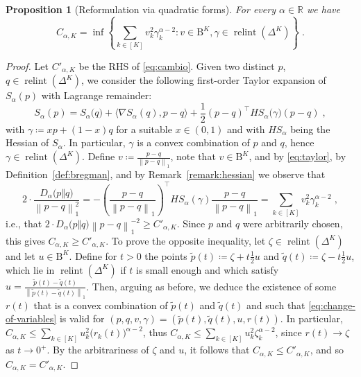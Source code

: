 \documentclass[11pt,oneside,a4paper]{article}
\newcommand{\R}{\mathbb{R}}
\newcommand{\lrb}[1]{\left(#1\right)}
\newcommand{\brb}[1]{\bigl(#1\bigr)}
\newcommand{\lcb}[1]{\left\{#1\right\}}
\newcommand{\lno}[1]{\left\lVert#1\right\rVert}
\theoremstyle{plain}
\newtheorem{proposition}[theorem]{Proposition}
\theoremstyle{definition}
\theoremstyle{remark}
\newcommand{\simplex}[1]{\Delta^{#1}}
\DeclareMathOperator*{\relint}{relint}
\newcommand{\tsphere}[1]{\mathrm{B}^{#1}}
\begin{document}
\begin{proposition}[Reformulation via quadratic forms]\label{prop:second_order}
For every $\alpha \in \R$ we have
\begin{equation}\label{eq:cambio}
     C_{\alpha, K}
=
    \inf \lcb{\sum_{k \in [K]} v_k^2 \gamma_k^{\alpha -2} : v \in \tsphere{K}, \gamma \in \relint\lrb{\simplex{K}}}\;.    
\end{equation}
\end{proposition}
\begin{proof}
Let $C'_{\alpha, K}$ be the RHS of \eqref{eq:cambio}.
Given two distinct $p$, $q \in \relint\lrb{\simplex{K}}$, we consider the following first-order Taylor expansion of $S_{\alpha}(p)$ with Lagrange remainder:
\begin{equation}\label{eq:taylor}
    S_{\alpha}(p)
    = S_{\alpha}\brb{q} + \langle\nabla S_{\alpha}(q), p-q \rangle
    + \frac{1}{2} (p-q)^\top H S_{\alpha}\brb{\gamma} (p-q) \;,
\end{equation}    
with $\gamma \coloneq xp + (1-x) q$ for a suitable $x \in (0,1)$ and with $H S_{\alpha}$ being the Hessian of $S_\alpha$. In particular, $\gamma$ is a convex combination of $p$ and $q$, hence $\gamma \in \relint\lrb{\simplex{K}}$.
Define $v \coloneq \frac{p - q}{\lno{p - q}_1}$, note that $v \in \tsphere{K}$,
and by \eqref{eq:taylor}, by Definition~\ref{def:bregman}, and by Remark~\ref{remark:hessian} we observe that
\begin{equation}\label{eq:change-of-variables}
    2\cdot \frac{D_\alpha\brb{p\Vert q}}{\lno{p - q}_1^2}
=
    -  \lrb{\frac{p - q}{\lno{p - q}_1}}^\top H S_{\alpha}(\gamma) \frac{p - q}{\lno{p - q}_1}
=
    \sum_{k \in [K]} v_k^2 \gamma_k^{\alpha -2}\;,
\end{equation}
i.e., that $2 \cdot D_\alpha\brb{p\Vert q}\lno{p - q}_1^{-2} \ge C'_{\alpha, K}$. Since $p$ and $q$ were arbitrarily chosen, this gives $C_{\alpha, K} \ge C'_{\alpha, K}$. To prove the opposite inequality,  let $\zeta \in \relint\lrb{\simplex{K}}$ and let $u \in \tsphere{K}$. Define for $t>0$ the points $\tilde{p}(t) \coloneq \zeta + t \frac{1}{2} u$ and $\tilde{q}(t) \coloneq \zeta - t \frac{1}{2} u$,
which lie in $\relint\lrb{\simplex{K}}$ if $t$ is small enough 
and which satisfy $u = \frac{\tilde{p}(t) - \tilde{q}(t)}{\lno{\tilde{p}(t) - \tilde{q}(t)}_1}$.
Then, arguing as before, we deduce the existence of some
$r(t)$ that is a convex combination of $\tilde{p}(t)$ and $\tilde{q}(t)$ and such that 
\eqref{eq:change-of-variables} is valid for
$(p, q, v, \gamma) = (\tilde{p}(t), \tilde{q}(t), u, r(t))$.
In particular, $C_{\alpha, K} \le \sum_{k \in [K]} u_k^2 \brb{r_k(t)}^{\alpha -2}$, thus 
$C_{\alpha, K} \le \sum_{k \in [K]} u_k^2 \zeta_k^{\alpha -2}$,
since $r(t) \to \zeta$ as $t \to 0^+$. By the arbitrariness of $\zeta$ and $u$, it follows that $C_{\alpha, K} \le C'_{\alpha, K}$, and so $C_{\alpha, K} = C'_{\alpha, K}$.
\end{proof}
\end{document}
